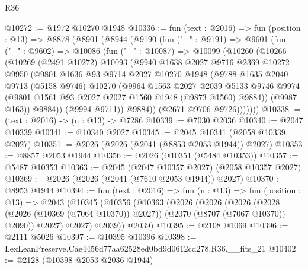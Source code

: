 \begin{lexlean}{R36}
\begin{coremodule}
@10272 := @1972 @10270 @1948
@10336 := fun (text : @2016) =>
  fun (position : @13) =>
  @8878
    (@8901
      (@8944
        (@9190
          (fun ("_" : @9191) =>
          @9601
            (fun ("_" : @9602) =>
            @10086
              (fun ("_" : @10087) =>
              @10099
                (@10260
                  (@10266
                    (@10269
                      (@2491 @10272)
                      @10093
                      (@9940
                        @1638
                        @2027
                        @9716
                        @2369
                        @10272
                        @9950
                        (@9801
                          @1636
                          @93
                          @9714
                          @2027
                          @10270
                          @1948
                          (@9788
                            @1635
                            @2040
                            @9713
                            (@5158 @9746)
                            @10270
                            (@9964
                              @1563
                              @2027
                              @2039
                              @5133
                              @9746
                              @9974
                              (@9801 @1561 @93 @2027 @2027 @1560 @1948 (@9873 @1560) @9884))
                            (@9987 @163))
                          @9884))
                      (@9994 @9711))
                    @9884))
                (@2671 @9706 @9726)))))))
@10338 := (text : @2016) -> (n : @13) -> @7286
@10339 := @7030 @2036
@10340 := @2047 @10339
@10341 := @10340 @2027
@10345 := @2045 @10341 (@2058 @10339 @2027)
@10351 := @2026 (@2026 (@2041 (@8853 @2053 @1944)) @2027)
@10353 := @8857 @2053 @1944
@10356 := @2026 (@10351 (@5484 @10353))
@10357 := @5487 @10353
@10363 := @2045 (@2047 @10357 @2027) (@2058 @10357 @2027)
@10369 := @2026 (@2026 (@2041 (@7610 @2053 @1944)) @2027)
@10370 := @8953 @1944
@10394 := fun (text : @2016) =>
  fun (n : @13) =>
  fun (position : @13) =>
  @2043
    (@10345
      (@10356
        (@10363
          (@2026
            (@2026
              (@2026
                (@2028 (@2026 (@10369 (@7064 @10370)) @2027))
                (@2070 (@8707 (@7067 @10370)) @2090))
              @2027)
            @2027)
          @2039))
      @2039)
@10395 := @2108 @1069
@10396 := @2111 @5026
@10397 := @10395 @10396
@10398 := LexLeanPreserve.Cae4456d77aa62528ed0bd9d0612cd278.R36.__fits_21
@10402 := @2128 (@10398 @2053 @2036 @1944)

\end{coremodule}
\end{lexlean}
